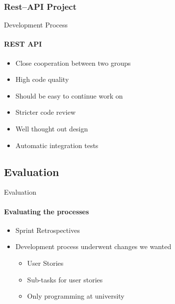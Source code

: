 	\subsubsection{Rest--API Project}
		\begin{frame}[t]{Development Process}\framesubtitle{REST API}
	
    \begin{itemize}
        \item Close cooperation between two groups
        \item High code quality
        \item Should be easy to continue work on
        \item Stricter code review
        \item Well thought out design
        \item Automatic integration tests
    \end{itemize}
	\end{frame}

	\subsection{Evaluation}
		\begin{frame}[t]{Evaluation}\framesubtitle{Evaluating the processes}
	
    \begin{itemize}
        \item Sprint Retrospectives
        \item Development process underwent changes we wanted
        \begin{itemize}
        	\item User Stories
        	\item Sub-tasks for user stories
            \item Only programming at university
        \end{itemize}
    \end{itemize}
	\end{frame}